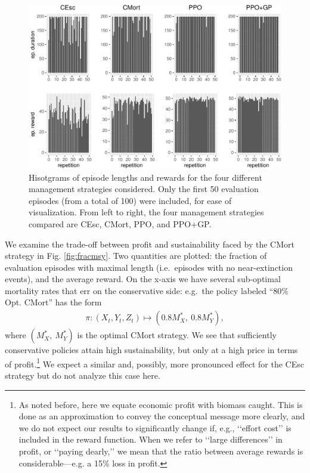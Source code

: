 \documentclass{article}
\begin{document}
\begin{figure}
\includegraphics[width=6in]{manuscript_files/figure-latex/ephistograms-1} \caption{Hisotgrams of episode lengths and rewards for the four different management strategies considered. Only the first 50 evaluation episodes (from a total of 100) were included, for ease of visualization. From left to right, the four management strategies compared are CEsc, CMort, PPO, and PPO+GP.}\label{fig:ephistograms}
\end{figure}

We examine the trade-off between profit and sustainability faced by the
CMort strategy in Fig. \ref{fig:fracmsy}. Two quantities are plotted:
the fraction of evaluation episodes with maximal length (i.e.~episodes
with no near-extinction events), and the average reward. On the x-axis
we have several sub-optimal mortality rates that err on the conservative
side: e.g.~the policy labeled ``80\% Opt. CMort'' has the form
\begin{align*}
  \pi: (X_t, Y_t, Z_t)\mapsto (0.8 M_X^*,\ 0.8 M_Y^*),
\end{align*} where \((M_X^*,\ M_Y^*)\) is the optimal CMort strategy. We
see that sufficiently conservative policies attain high sustainability,
but only at a high price in terms of profit.\footnote{
As noted before, here we equate economic profit with biomass caught.
This is done as an approximation to convey the conceptual message more clearly, and we do not expect our results to significantly change if, e.g., ‘‘effort cost’’ is included in the reward function.
When we refer to ‘‘large differences’’ in profit, or ‘‘paying dearly,’’ we mean that the ratio between average rewards is considerable---e.g. a 15\% loss in profit.
} We expect a similar and, possibly, more pronounced effect for the CEsc
strategy but do not analyze this case here.
\end{document}

